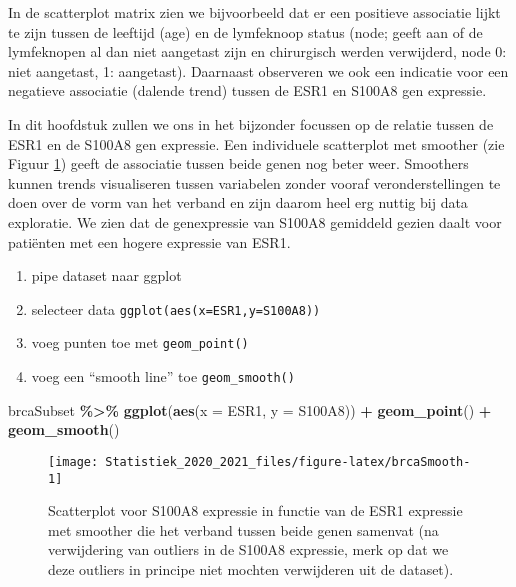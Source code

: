 \documentclass[
  12pt,dutch,coursenotes]{book}
\newenvironment{Shaded}{\begin{snugshade}}{\end{snugshade}}
\newcommand{\DataTypeTok}[1]{\textcolor[rgb]{0.13,0.29,0.53}{#1}}
\newcommand{\KeywordTok}[1]{\textcolor[rgb]{0.13,0.29,0.53}{\textbf{#1}}}
\newcommand{\NormalTok}[1]{#1}
\newcommand{\OperatorTok}[1]{\textcolor[rgb]{0.81,0.36,0.00}{\textbf{#1}}}
\newcommand{\StringTok}[1]{\textcolor[rgb]{0.31,0.60,0.02}{#1}}
\providecommand{\tightlist}{%
  \setlength{\itemsep}{0pt}\setlength{\parskip}{0pt}}
\theoremstyle{definition}
\theoremstyle{definition}
\theoremstyle{definition}
\theoremstyle{remark}
\begin{document}
In de scatterplot matrix zien we bijvoorbeeld dat er een positieve associatie lijkt te zijn tussen de leeftijd (age) en de lymfeknoop status (node; geeft aan of de lymfeknopen al dan niet aangetast zijn en chirurgisch werden verwijderd, node 0: niet aangetast, 1: aangetast). Daarnaast observeren we ook een indicatie voor een negatieve associatie (dalende trend) tussen de ESR1 en S100A8 gen expressie.

In dit hoofdstuk zullen we ons in het bijzonder focussen op de relatie tussen de ESR1 en de S100A8 gen expressie. Een individuele scatterplot met smoother (zie Figuur \ref{fig:brcaSmooth}) geeft de associatie tussen beide genen nog beter weer.
Smoothers kunnen trends visualiseren tussen variabelen zonder vooraf veronderstellingen te doen over de vorm van het verband en zijn daarom heel erg nuttig bij data exploratie.
We zien dat de genexpressie van S100A8 gemiddeld gezien daalt voor patiënten met een hogere expressie van ESR1.

\begin{enumerate}
\def\labelenumi{\arabic{enumi}.}
\tightlist
\item
  pipe dataset naar ggplot
\item
  selecteer data \texttt{ggplot(aes(x=ESR1,y=S100A8))}
\item
  voeg punten toe met \texttt{geom\_point()}
\item
  voeg een ``smooth line'' toe \texttt{geom\_smooth()}
\end{enumerate}

\begin{Shaded}
\begin{Highlighting}[]
\NormalTok{brcaSubset }\OperatorTok{\%\textgreater{}\%}\StringTok{ }\KeywordTok{ggplot}\NormalTok{(}\KeywordTok{aes}\NormalTok{(}\DataTypeTok{x =}\NormalTok{ ESR1, }\DataTypeTok{y =}\NormalTok{ S100A8)) }\OperatorTok{+}\StringTok{ }
\StringTok{    }\KeywordTok{geom\_point}\NormalTok{() }\OperatorTok{+}\StringTok{ }\KeywordTok{geom\_smooth}\NormalTok{()}
\end{Highlighting}
\end{Shaded}

\begin{figure}

{\centering \texttt{[image: Statistiek\_2020\_2021\_files/figure-latex/brcaSmooth-1]} 

}

\caption{Scatterplot voor S100A8 expressie in functie van de ESR1 expressie met smoother die het verband tussen beide genen samenvat (na verwijdering van outliers in de S100A8 expressie, merk op dat we deze outliers in principe niet mochten verwijderen uit de dataset).}\label{fig:brcaSmooth}
\end{figure}
\end{document}
